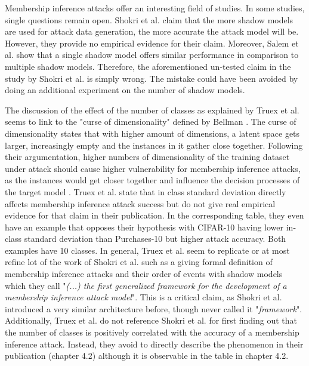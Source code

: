\documentclass[runningheads]{llncs}
\begin{document}
Membership inference attacks offer an interesting field of studies. In some studies, single questions remain open.
Shokri et al. \cite{shokri2017membership} claim that the more shadow models are used for attack data generation, the more accurate the attack model will be. However, they provide no empirical evidence for their claim. Moreover, Salem et al. \cite{salem2018ml} show that a single shadow model offers similar performance in comparison to multiple shadow models. Therefore, the aforementioned un-tested claim in the study by Shokri et al. is simply wrong. The mistake could have been avoided by doing an additional experiment on the number of shadow models.
\par
The discussion of the effect of the number of classes as explained by Truex et al. \cite{truex2018towards} seems to link to the  "curse of dimensionality" defined by Bellman \cite{Bellman:DynamicProgramming}. The curse of dimensionality states that with higher amount of dimensions, a latent space gets larger, increasingly empty and the instances in it gather close together. Following their argumentation, higher numbers of dimensionality of the training dataset under attack should cause higher vulnerability for membership inference attacks, as the instances would get closer together and influence the decision processes of the target model \cite{truex2018towards}.
Truex et al. state that in class standard deviation directly affects membership inference attack success but do not give real empirical evidence for that claim in their publication. In the corresponding table, they even have an example that opposes their hypothesis with CIFAR-10 having lower in-class standard deviation than Purchases-10 but higher attack accuracy. Both examples have 10 classes.
In general, Truex et al. \cite{truex2018towards} seem to replicate or at most refine lot of the work of Shokri et al. \cite{shokri2017membership} such as a giving formal definition of membership inference attacks and their order of events with shadow models which they call "\textit{(...) the first generalized framework for the development of a membership inference attack model}". This is a critical claim, as Shokri et al. \cite{shokri2017membership} introduced a very similar architecture before, though never called it "\textit{framework}". Additionally, Truex et al. \cite{truex2018towards} do not reference Shokri et al. \cite{shokri2017membership} for first finding out that the number of classes is positively correlated with the accuracy of a membership inference attack. Instead, they avoid to directly describe the phenomenon in their publication (chapter 4.2) although it is observable in the table in chapter 4.2.
\end{document}

